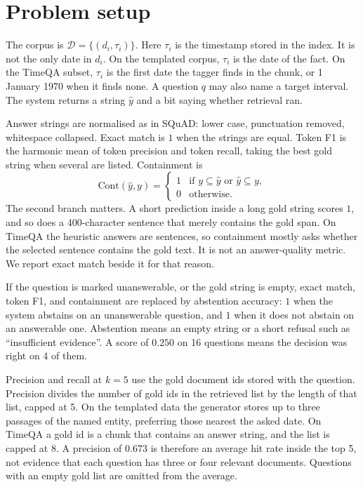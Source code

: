 \documentclass[11pt]{article}
\begin{document}
\section{Problem setup}
\label{sec:setup}

The corpus is $\mathcal{D}=\{(d_i,\tau_i)\}$.
Here $\tau_i$ is the timestamp stored in the index.
It is not the only date in $d_i$.
On the templated corpus, $\tau_i$ is the date of the fact.
On the TimeQA subset, $\tau_i$ is the first date the tagger finds in the chunk, or 1 January 1970 when it finds none.
A question $q$ may also name a target interval.
The system returns a string $\hat{y}$ and a bit saying whether retrieval ran.

Answer strings are normalised as in SQuAD: lower case, punctuation removed, whitespace collapsed.
Exact match is $1$ when the strings are equal.
Token F1 is the harmonic mean of token precision and token recall, taking the best gold string when several are listed.
Containment is
\begin{equation}
\mathrm{Cont}(\hat{y}, y) =
\begin{cases}
1 & \text{if } y \subseteq \hat{y} \text{ or } \hat{y} \subseteq y,\\
0 & \text{otherwise.}
\end{cases}
\end{equation}
The second branch matters.
A short prediction inside a long gold string scores $1$, and so does a 400-character sentence that merely contains the gold span.
On TimeQA the heuristic answers are sentences, so containment mostly asks whether the selected sentence contains the gold text.
It is not an answer-quality metric.
We report exact match beside it for that reason.

If the question is marked unanswerable, or the gold string is empty, exact match, token F1, and containment are replaced by abstention accuracy:
$1$ when the system abstains on an unanswerable question, and $1$ when it does not abstain on an answerable one.
Abstention means an empty string or a short refusal such as ``insufficient evidence''.
A score of $0.250$ on 16 questions means the decision was right on 4 of them.

Precision and recall at $k{=}5$ use the gold document ids stored with the question.
Precision divides the number of gold ids in the retrieved list by the length of that list, capped at 5.
On the templated data the generator stores up to three passages of the named entity, preferring those nearest the asked date.
On TimeQA a gold id is a chunk that contains an answer string, and the list is capped at 8.
A precision of $0.673$ is therefore an average hit rate inside the top 5, not evidence that each question has three or four relevant documents.
Questions with an empty gold list are omitted from the average.
\end{document}

